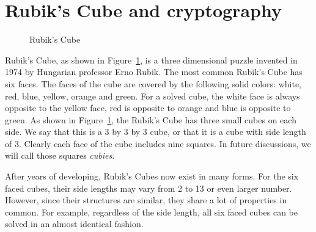 \section{Rubik's Cube and cryptography}
\begin{figure}
    \centering
    \caption{Rubik's Cube}\label{fig:solved-cube}
\end{figure}
\par Rubik's Cube, as shown in Figure~\ref{fig:solved-cube}, is a three dimensional puzzle invented in 1974 by Hungarian professor Erno Rubik. The most common Rubik's Cube has six faces. The faces of the cube are covered by the following solid colors: white, red, blue, yellow, orange and green. For a solved cube, the white face is always opposite to the yellow face, red is opposite to orange and blue is opposite to green. As shown in Figure~\ref{fig:solved-cube}, the Rubik's Cube has three small cubes on each side. We say that this is a 3 by 3 by 3 cube, or that it is a cube with side length of 3. Clearly each face of the cube includes nine squares. In future discussions, we will call those squares \textit{cubies}.
\par After years of developing, Rubik's Cubes now exist in many forms. For the six faced cubes, their side lengths may vary from 2 to 13 or even larger number. However, since their structures are similar, they share a lot of properties in common. For example, regardless of the side length, all six faced cubes can be solved in an almost identical fashion. 
